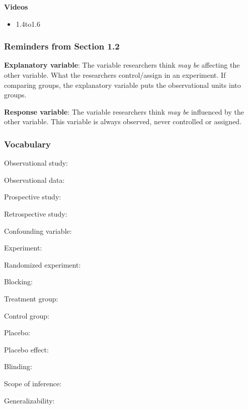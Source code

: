 \documentclass[
]{report}
\providecommand{\tightlist}{%
  \setlength{\itemsep}{0pt}\setlength{\parskip}{0pt}}
\newcommand{\rgs}{\vspace{12pt}} %
\newcommand{\rgi}{\hspace{24pt}}  %
\begin{document}

\textbf{Videos}

\begin{itemize}
\tightlist
\item
  1.4to1.6
\end{itemize}


\hypertarget{reminders-from-section-1.2}{%
\subsubsection*{Reminders from Section 1.2}\label{reminders-from-section-1.2}}

\textbf{Explanatory variable}: The variable researchers think \emph{may be} affecting the other variable. What the researchers control/assign in an experiment. If comparing groups, the explanatory variable puts the observational units into groups.

\textbf{Response variable}: The variable researchers think \emph{may be} influenced by the other variable. This variable is always observed, never controlled or assigned.

\hypertarget{vocabulary-2}{%
\subsubsection*{Vocabulary}\label{vocabulary-2}}

Observational study:
\rgs

\rgi Observational data:
\rgs

\rgi Prospective study:
\rgs

\rgi Retrospective study:
\rgs

Confounding variable:
\rgs

Experiment:
\rgs

\rgi Randomized experiment:
\rgs

\rgi Blocking:
\rgs

\rgi Treatment group:
\rgs

\rgi Control group:
\rgs

\rgi Placebo:
\rgs

\rgi Placebo effect:
\rgs

\rgi Blinding:
\rgs

Scope of inference:
\rgs

Generalizability:
\rgs
\end{document}
